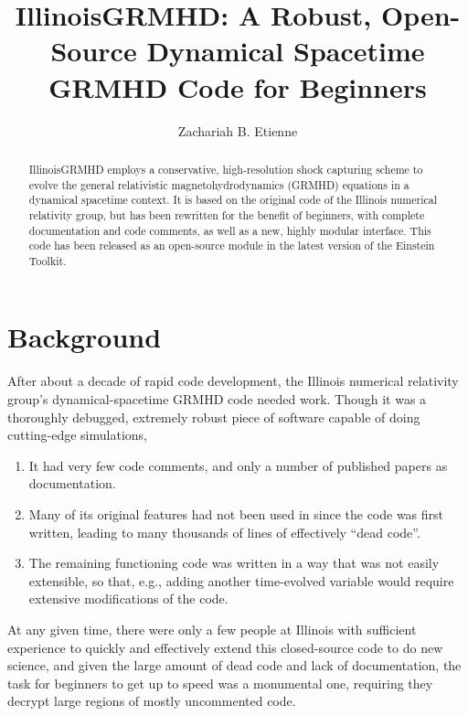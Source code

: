\documentclass[showpacs,amsmath,amssymb,prd]{revtex4}
\begin{document}
\title{IllinoisGRMHD: A Robust, Open-Source Dynamical Spacetime GRMHD Code
    for Beginners}
\author{Zachariah B. Etienne}

\begin{abstract}
IllinoisGRMHD employs a conservative, high-resolution shock capturing
scheme to evolve the general relativistic magnetohydrodynamics (GRMHD)
equations in a dynamical spacetime context. It is based on the
original code of the Illinois numerical relativity group, but has been
rewritten for the benefit of beginners, with complete documentation
and code comments, as well as a new, highly modular interface. This
code has been released as an open-source module in the latest version
of the Einstein Toolkit.
\end{abstract}

\maketitle

\section{Background}
After about a decade of rapid code development, the Illinois numerical
relativity group's dynamical-spacetime GRMHD code needed work. Though
it was a thoroughly debugged, extremely robust piece of software capable
of doing cutting-edge simulations, 
\begin{enumerate} 
\item It had very few code comments, and only a number of published
  papers as documentation.
\item Many of its original features had not been used
in since the code was first written, leading to many thousands of
lines of effectively ``dead code''.
\item The remaining functioning code was written in a way that was not
  easily extensible, so that, e.g., adding another time-evolved
  variable would require extensive modifications of the code.
\end{enumerate}
At any given time, there were only a
few people at Illinois with sufficient experience to quickly and
effectively extend this closed-source code to do new science, and
given the large amount of dead code and lack of documentation, the
task for beginners to get up to speed was a monumental one, requiring
they decrypt large regions of mostly uncommented code.
\end{document}
